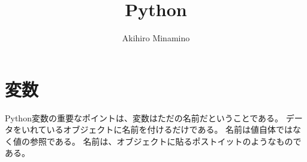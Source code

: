 \documentclass[11pt, oneside]{article}   	%
\title{Python}
\author{Akihiro Minamino}
\begin{document}
\maketitle
\section{変数}
Python変数の重要なポイントは、変数はただの名前だということである。
データをいれているオブジェクトに名前を付けるだけである。
名前は値自体ではなく値の参照である。
名前は、オブジェクトに貼るポストイットのようなものである。
\end{document}
